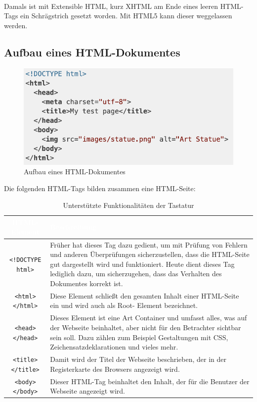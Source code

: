 \mbox{}\\
Damals ist mit Extensible HTML, kurz XHTML am Ende eines leeren HTML-Tags ein Schrägstrich gesetzt worden. Mit HTML5 kann dieser weggelassen werden. 

\subsection{Aufbau eines HTML-Dokumentes}

\begin{figure}[H]
	\begin{center}
		\includegraphics[scale=.7]{images/html-document-structure.png}
	\end{center}
		\caption{Aufbau eines HTML-Dokumentes}
\end{figure}

Die folgenden HTML-Tags bilden zusammen eine HTML-Seite:

\begin{table}[H]
	\begin{center}
	\begin{tabular}{| c | m{10cm} |}
		\hline
 		\cellcolor{Gray}\textcolor{White}{HTML-Element} & \cellcolor{Gray}\textcolor{White}{Beschreibung}  \\
		\hline
		\texttt{<!DOCTYPE html>} & Früher hat dieses Tag dazu gedient, um mit Prüfung von Fehlern und anderen 
			Überprüfungen sicherzustellen, dass die HTML-Seite gut dargestellt wird und funktioniert. Heute dient dieses Tag 
			lediglich dazu, um sicherzugehen, dass das Verhalten des Dokumentes korrekt ist.\\
		\hline
		\texttt{<html></html>} & Diese Element schließt den gesamten Inhalt einer HTML-Seite ein und wird auch als Root-
			Element bezeichnet.\\
		\hline
		\texttt{<head></head>} & Dieses Element ist eine Art Container und umfasst alles, was auf der Webseite beinhaltet, 
			aber nicht für den Betrachter sichtbar sein soll. Dazu zählen zum Beispiel Gestaltungen mit CSS, 
			Zeichensatzdeklarationen und vieles mehr.\\
		\hline
		\texttt{<title></title>} & Damit wird der Titel der Webseite beschrieben, der in der Registerkarte des Browsers angezeigt 
			wird.\\
		\hline
		\texttt{<body></body>} & Dieser HTML-Tag beinhaltet den Inhalt, der für die Benutzer der Webseite angezeigt wird. \\
		\hline
	\end{tabular}
	\end{center}
	\caption{Unterstützte Funktionalitäten der Tastatur}
\end{table}

